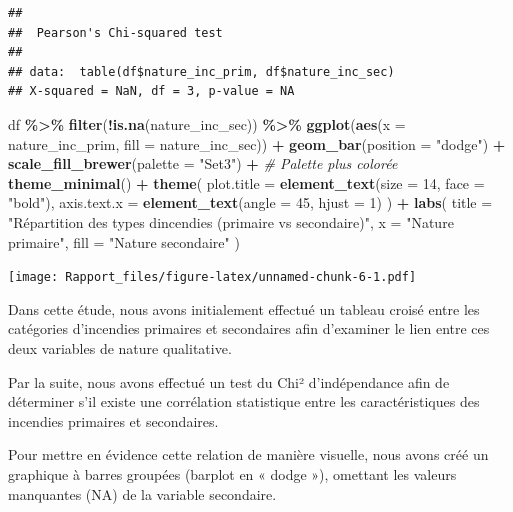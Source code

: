 \documentclass[
]{article}
\newenvironment{Shaded}{\begin{snugshade}}{\end{snugshade}}
\newcommand{\AttributeTok}[1]{\textcolor[rgb]{0.13,0.29,0.53}{#1}}
\newcommand{\CommentTok}[1]{\textcolor[rgb]{0.56,0.35,0.01}{\textit{#1}}}
\newcommand{\DecValTok}[1]{\textcolor[rgb]{0.00,0.00,0.81}{#1}}
\newcommand{\FunctionTok}[1]{\textcolor[rgb]{0.13,0.29,0.53}{\textbf{#1}}}
\newcommand{\NormalTok}[1]{#1}
\newcommand{\SpecialCharTok}[1]{\textcolor[rgb]{0.81,0.36,0.00}{\textbf{#1}}}
\newcommand{\StringTok}[1]{\textcolor[rgb]{0.31,0.60,0.02}{#1}}
\begin{document}
\begin{verbatim}
## 
##  Pearson's Chi-squared test
## 
## data:  table(df$nature_inc_prim, df$nature_inc_sec)
## X-squared = NaN, df = 3, p-value = NA
\end{verbatim}

\begin{Shaded}
\begin{Highlighting}[]
\NormalTok{df }\SpecialCharTok{\%\textgreater{}\%}
  \FunctionTok{filter}\NormalTok{(}\SpecialCharTok{!}\FunctionTok{is.na}\NormalTok{(nature\_inc\_sec)) }\SpecialCharTok{\%\textgreater{}\%}
  \FunctionTok{ggplot}\NormalTok{(}\FunctionTok{aes}\NormalTok{(}\AttributeTok{x =}\NormalTok{ nature\_inc\_prim, }\AttributeTok{fill =}\NormalTok{ nature\_inc\_sec)) }\SpecialCharTok{+} 
  \FunctionTok{geom\_bar}\NormalTok{(}\AttributeTok{position =} \StringTok{"dodge"}\NormalTok{) }\SpecialCharTok{+}
  \FunctionTok{scale\_fill\_brewer}\NormalTok{(}\AttributeTok{palette =} \StringTok{"Set3"}\NormalTok{) }\SpecialCharTok{+}  \CommentTok{\# Palette plus colorée}
  \FunctionTok{theme\_minimal}\NormalTok{() }\SpecialCharTok{+}
  \FunctionTok{theme}\NormalTok{(}
    \AttributeTok{plot.title =} \FunctionTok{element\_text}\NormalTok{(}\AttributeTok{size =} \DecValTok{14}\NormalTok{, }\AttributeTok{face =} \StringTok{"bold"}\NormalTok{),}
    \AttributeTok{axis.text.x =} \FunctionTok{element\_text}\NormalTok{(}\AttributeTok{angle =} \DecValTok{45}\NormalTok{, }\AttributeTok{hjust =} \DecValTok{1}\NormalTok{)}
\NormalTok{  ) }\SpecialCharTok{+}
  \FunctionTok{labs}\NormalTok{(}
    \AttributeTok{title =} \StringTok{"Répartition des types d\textquotesingle{}incendies (primaire vs secondaire)"}\NormalTok{,}
    \AttributeTok{x =} \StringTok{"Nature primaire"}\NormalTok{,}
    \AttributeTok{fill =} \StringTok{"Nature secondaire"}
\NormalTok{  )}
\end{Highlighting}
\end{Shaded}

\texttt{[image: Rapport\_files/figure-latex/unnamed-chunk-6-1.pdf]}

Dans cette étude, nous avons initialement effectué un tableau croisé
entre les catégories d'incendies primaires et secondaires afin
d'examiner le lien entre ces deux variables de nature qualitative.

Par la suite, nous avons effectué un test du Chi² d'indépendance afin de
déterminer s'il existe une corrélation statistique entre les
caractéristiques des incendies primaires et secondaires.

Pour mettre en évidence cette relation de manière visuelle, nous avons
créé un graphique à barres groupées (barplot en « dodge »), omettant les
valeurs manquantes (NA) de la variable secondaire.
\end{document}

